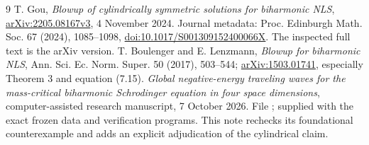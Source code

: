 \documentclass[11pt,a4paper]{article}
\begin{document}
\begin{thebibliography}{9}
 T. Gou, \emph{Blowup of cylindrically symmetric solutions for biharmonic NLS}, \href{https://arxiv.org/html/2205.08167v3}{arXiv:2205.08167v3}, 4 November 2024. Journal metadata: Proc. Edinburgh Math. Soc. 67 (2024), 1085--1098, \href{https://doi.org/10.1017/S001309152400066X}{doi:10.1017/S001309152400066X}. The inspected full text is the arXiv version.
 T. Boulenger and E. Lenzmann, \emph{Blowup for biharmonic NLS}, Ann. Sci. Ec. Norm. Super. 50 (2017), 503--544; \href{https://arxiv.org/pdf/1503.01741}{arXiv:1503.01741}, especially Theorem 3 and equation (7.15).
 \emph{Global negative-energy traveling waves for the mass-critical biharmonic Schrodinger equation in four space dimensions}, computer-assisted research manuscript, 7 October 2026. File ; supplied with the exact frozen data and verification programs. This note rechecks its foundational counterexample and adds an explicit adjudication of the cylindrical claim.
\end{thebibliography}
\end{document}
